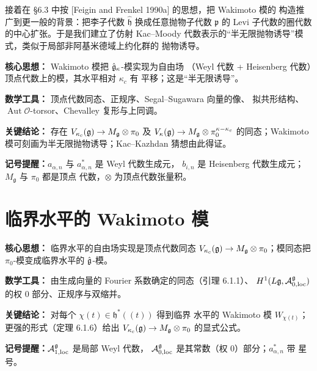 接着在 \S6.3 中按 [Feigin and Frenkel 1990a] 的思想，把 Wakimoto 模的
构造推广到更一般的背景：把李子代数 $\widehat{\mathfrak h}$ 换成任意抛物子代数
$\mathfrak p$ 的 Levi 子代数的圈代数的中心扩张。于是我们建立了仿射
Kac--Moody 代数表示的“半无限抛物诱导”模式，类似于局部非阿基米德域上约化群的
抛物诱导。

\begin{keypoints}
    \item \textbf{核心思想：} Wakimoto 模把 $\hat{\mathfrak{g}}_\kappa$-模实现为自由场
    （Weyl 代数 + Heisenberg 代数）顶点代数上的模，其水平相对 $\kappa_c$ 有
    平移；这是“半无限诱导”。
    \item \textbf{数学工具：} 顶点代数同态、正规序、Segal--Sugawara 向量的像、
    拟共形结构、$\operatorname{Aut}\mathcal O$-torsor、Chevalley 复形与上同调。
    \item \textbf{关键结论：} 存在 $V_{\kappa_c}(\mathfrak{g})\to M_{\mathfrak g}\otimes
    \pi_0$ 及 $V_\kappa(\mathfrak{g})\to M_{\mathfrak g}\otimes\pi_0^{\kappa-\kappa_c}$
    的同态；Wakimoto 模可刻画为半无限抛物诱导；Kac--Kazhdan 猜想由此得证。
    \item \textbf{记号提醒：}$a_{\alpha,n}$ 与 $a^*_{\alpha,n}$ 是 Weyl 代数生成元，
    $b_{i,n}$ 是 Heisenberg 代数生成元；$M_{\mathfrak g}$ 与 $\pi_0$ 都是顶点
    代数，$\otimes$ 为顶点代数张量积。
\end{keypoints}

\section{临界水平的 Wakimoto 模}

\setcounter{theorem}{0}

\begin{keypoints}
    \item \textbf{核心思想：} 临界水平的自由场实现是顶点代数同态
    $V_{\kappa_c}(\mathfrak{g})\to M_{\mathfrak g}\otimes\pi_0$；模同态把
    $\pi_0$-模变成临界水平的 $\hat{\mathfrak{g}}$-模。
    \item \textbf{数学工具：} 由生成向量的 Fourier 系数确定的同态（引理 6.1.1）、
    $H^1(L\mathfrak{g},\mathcal{A}^{\mathfrak g}_{0,\mathrm{loc}})$ 的权 0 部分、正规序与双缩并。
    \item \textbf{关键结论：} 对每个 $\chi(t)\in\mathfrak h^*(\!(t)\!)$ 得到临界
    水平的 Wakimoto 模 $W_{\chi(t)}$；更强的形式（定理 6.1.6）给出
    $V_{\kappa_c}(\mathfrak{g})\to M_{\mathfrak g}\otimes\pi_0$ 的显式公式。
    \item \textbf{记号提醒：}$\mathcal{A}^{\mathfrak g}_{1,\mathrm{loc}}$ 是局部 Weyl 代数，
    $\mathcal{A}^{\mathfrak g}_{0,\mathrm{loc}}$ 是其常数（权 0）部分；$a^*_{\alpha,n}$ 带
    星号。
\end{keypoints}


